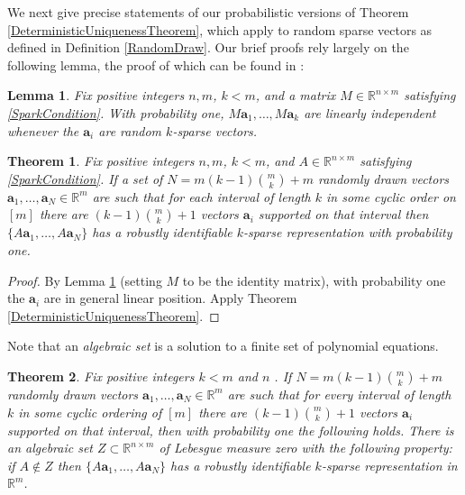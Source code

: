 \documentclass[journal, onecolumn]{IEEEtran}
\newtheorem{theorem}{Theorem}
\newtheorem{lemma}{Lemma}
\begin{document}
We next give precise statements of our probabilistic versions of Theorem \ref{DeterministicUniquenessTheorem}, which apply to random sparse vectors as defined in Definition \ref{RandomDraw}. Our brief proofs rely largely on the following lemma, the proof of which can be found in \cite[Lemma 3]{Hillar15}:
\begin{lemma}\label{Hillar15lemma2}
Fix positive integers $n, m$, $k < m$, and a matrix $M \in \mathbb{R}^{n \times m}$ satisfying \eqref{SparkCondition}. With probability one, $M\mathbf{a}_1, \ldots, M\mathbf{a}_k$ are linearly independent whenever the $\mathbf{a}_i$ are random $k$-sparse vectors.
\end{lemma}

\begin{theorem}\label{Theorem2}
Fix positive integers $n, m$, $k < m$, and $A \in \mathbb{R}^{n \times m}$ satisfying \eqref{SparkCondition}. If a set of $N = m(k-1){m \choose k}+m$ randomly drawn vectors $\mathbf{a}_1, \ldots, \mathbf{a}_N \in \mathbb{R}^m$ are such that for each interval of length $k$ in some cyclic order on $[m]$ there are $(k-1){m \choose k} + 1$ vectors $\mathbf{a}_i$ supported on that interval then $\{A\mathbf{a}_1, \ldots, A\mathbf{a}_N\}$ has a robustly identifiable $k$-sparse representation with probability one.
\end{theorem}

\begin{proof}
By Lemma \ref{Hillar15lemma2} (setting $M$ to be the identity matrix), with probability one the $\mathbf{a}_i$ are in general linear position. Apply Theorem \ref{DeterministicUniquenessTheorem}.
\end{proof} 

Note that an \emph{algebraic set} is a solution to a finite set of polynomial equations. 

\begin{theorem}\label{Theorem3}
Fix positive integers $k < m$ and $n$ . If $N = m(k-1){m \choose k}+m$ randomly drawn vectors $\mathbf{a}_1, \ldots, \mathbf{a}_N \in \mathbb{R}^m$ are such that for every interval of length $k$ in some cyclic ordering of $[m]$ there are $(k-1){m \choose k}+1$ vectors $\mathbf{a}_i$ supported on that interval, then with probability one the following holds. There is an algebraic set $Z \subset \mathbb{R}^{n \times m}$ of Lebesgue measure zero with the following property: if $A \notin Z$ then $\{A\mathbf{a}_1, \ldots , A\mathbf{a}_N \}$ has a robustly identifiable $k$-sparse representation in $\mathbb{R}^m$.
\end{theorem}
\end{document}
